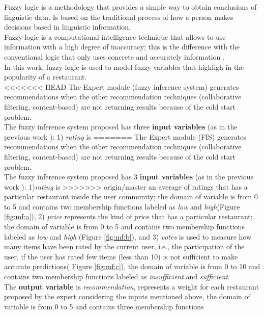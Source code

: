 Fuzzy logic is a methodology that provides a simple way to obtain
conclusions of linguistic data. Is based on the traditional process of
how a person makes decisions based in linguistic information. \\ Fuzzy
logic is a computational intelligence technique that allows to use
information with a high degree of inaccuracy; this is the difference
with the conventional logic that only uses concrete and accurately
information  \cite{zedeh1989knowledge}.\\  In this work, fuzzy logic is
used to model fuzzy variables that highligh in the popularity of a
restaurant.\\   
<<<<<<< HEAD
The Expert module (fuzzy inference system) generates 
recommendations  when the other
recommendation techniques (collaborative filtering, content-based) are
not returning results because of the cold start problem.\\   The fuzzy
inference system proposed has three \textbf{input variables} (as 
in the previous work  \cite{garcia2009hybrid}): 1) \textit{rating} is
=======
The Expert module (FIS) generates recommendations when the other
recommendation techniques (collaborative filtering, content-based) are
not returning results because of the cold start problem.\\   The fuzzy
inference system proposed has 3 \textbf{input variables} (as 
in the previous work \cite{garcia2009hybrid}): 1)\textit{rating} is
>>>>>>> origin/master
an average of ratings that has a particular restaurant inside the user
community; the domain of variable is from 0 to 5 and contains two membership
functions labeled as \textit{low} and \textit{high}(Figure  \ref{fig:mf:a}), 
2) \textit{price} represents the kind of price that
has a particular restaurant; the domain of variable is from 0 to 5 and
contains two membership functions labeled as \textit{low} and
\textit{high} (Figure  \ref{fig:mf:b}), and 3) \textit{votes} is used to
measure how many items have been rated by the current user, i.e., the
participation of the user, if the user has rated few items (less than
10) is not sufficient to make accurate predictions( Figure  \ref{fig:mf:c}), 
the domain of variable is from 0 to 10 and contains two
membership functions labeled as \textit{insufficient} and
\textit{sufficient}. \\ The \textbf{output variable} is
\textit{recommendation}, represents a weight for each restaurant
proposed by the expert considering the inputs mentioned above, the
domain of variable is from 0 to 5 and contains three membership functions
